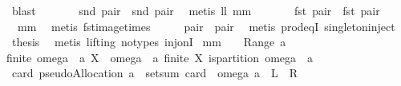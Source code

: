 \begin{isabellebody}
\ blast\isanewline
\ \ \isamarkupfalse%
\ \isamarkupfalse%
\ \isamarkupfalse%
\ {\isachardoublequoteopen}snd\ pair{}\ {\isacharequal}\ snd\ pair{}{\isachardoublequoteclose}\ \isamarkupfalse%
\ {\isacharparenleft}metis\ ll{}{}\ mm{}{}{\isacharparenright}\isanewline
\ \ \isamarkupfalse%
\ \isamarkupfalse%
\ \isamarkupfalse%
\ {\isachardoublequoteopen}{\isacharbraceleft}fst\ pair{}{\isacharbraceright}\ {\isacharequal}\ {\isacharbraceleft}fst\ pair{}{\isacharbraceright}{\isachardoublequoteclose}\ \isamarkupfalse%
\ {}\ mm{}{}\ \isamarkupfalse%
\ {\isacharparenleft}metis\ fst{\isacharunderscore}image{\isacharunderscore}times{\isacharparenright}\isanewline
\ \ \isamarkupfalse%
\ \isamarkupfalse%
\ {\isachardoublequoteopen}pair{}\ {\isacharequal}\ pair{}{\isachardoublequoteclose}\ \isamarkupfalse%
\ {\isacharparenleft}metis\ prod{\isacharunderscore}eqI\ singleton{\isacharunderscore}inject{\isacharparenright}\isanewline
\isacommand{{\isacharbraceright}}\isamarkupfalse%
\isanewline
{}\isamarkupfalse%
\ {\isacharquery}thesis\ \isamarkupfalse%
\ {\isacharparenleft}metis\ {\isacharparenleft}lifting{\isacharcomma}\ no{\isacharunderscore}types{\isacharparenright}\ inj{\isacharunderscore}onI{\isacharparenright}\isanewline
{}\isamarkupfalse%
%
\endisatagproof
{\isafoldproof}%
%
\isadelimproof
\isanewline
%
\endisadelimproof
\isanewline
{}\isamarkupfalse%
\ mm{}{}{\isacharcolon}\ \ {\isachardoublequoteopen}{\isacharbraceleft}{\isacharbraceright}\ {\isasymnotin}\ Range\ a{\isachardoublequoteclose}\ \isanewline
{\isachardoublequoteopen}finite\ {\isacharparenleft}omega\ {\isacharbackquote}\ a{\isacharparenright}{\isachardoublequoteclose}\ {\isachardoublequoteopen}{\isasymforall}X\ {\isasymin}\ omega\ {\isacharbackquote}\ a{\isachardot}\ finite\ X{\isachardoublequoteclose}\ {\isachardoublequoteopen}is{\isacharunderscore}partition\ {\isacharparenleft}omega\ {\isacharbackquote}\ a{\isacharparenright}{\isachardoublequoteclose}\isanewline
{}\ {\isachardoublequoteopen}card\ {\isacharparenleft}pseudoAllocation\ a{\isacharparenright}\ {\isacharequal}\ setsum\ {\isacharparenleft}card\ {\isasymcirc}\ omega{\isacharparenright}\ a{\isachardoublequoteclose}\ {\isacharparenleft}\ {\isachardoublequoteopen}{\isacharquery}L\ {\isacharequal}\ {\isacharquery}R{\isachardoublequoteclose}{\isacharparenright}\isanewline

\end{isabellebody}
